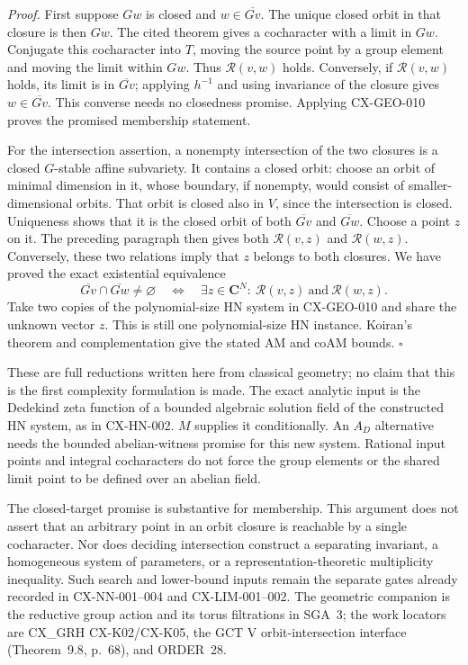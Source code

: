 \emph{Proof.} First suppose $Gw$ is closed and
$w\in\overline{Gv}$. The unique closed orbit in that closure is then
$Gw$. The cited theorem gives a cocharacter with a limit in $Gw$.
Conjugate this cocharacter into $T$, moving the source point by a group
element and moving the limit within $Gw$. Thus $\mathcal R(v,w)$
holds. Conversely, if $\mathcal R(v,w)$ holds, its limit is in
$\overline{Gv}$; applying $h^{-1}$ and using invariance of the closure
gives $w\in\overline{Gv}$. This converse needs no closedness promise.
Applying CX-GEO-010 proves the promised membership statement.

For the intersection assertion, a nonempty intersection of the two
closures is a closed $G$-stable affine subvariety. It contains a closed
orbit: choose an orbit of minimal dimension in it, whose boundary, if
nonempty, would consist of smaller-dimensional orbits. That orbit is
closed also in $V$, since the intersection is closed. Uniqueness shows
that it is the closed orbit of both $\overline{Gv}$ and
$\overline{Gw}$. Choose a point $z$ on it. The preceding paragraph
then gives both $\mathcal R(v,z)$ and $\mathcal R(w,z)$.
Conversely, these two relations imply that $z$ belongs to both closures.
We have proved the exact existential equivalence
\[
 \overline{Gv}\cap\overline{Gw}\ne\varnothing
       \quad\Longleftrightarrow\quad
       \exists z\in\mathbf C^N:\
                  \mathcal R(v,z)\ \text{and}\ \mathcal R(w,z).
\]
Take two copies of the polynomial-size HN system in CX-GEO-010 and share
the unknown vector $z$. This is still one polynomial-size HN instance.
Koiran's theorem and complementation give the stated AM and coAM bounds.
\hfill$\square$

These are full reductions written here from classical geometry; no claim
that this is the first complexity formulation is made. The exact analytic
input is the Dedekind zeta function of a bounded algebraic solution field
of the constructed HN system, as in CX-HN-002. $M$ supplies it
conditionally. An $A_D$ alternative needs the bounded abelian-witness
promise for this new system. Rational input points and integral
cocharacters do not force the group elements or the shared limit point
to be defined over an abelian field.

The closed-target promise is substantive for membership. This argument
does not assert that an arbitrary point in an orbit closure is reachable
by a single cocharacter. Nor does deciding intersection construct a
separating invariant, a homogeneous system of parameters, or a
representation-theoretic multiplicity inequality. Such search and
lower-bound inputs remain the separate gates already recorded in
CX-NN-001--004 and CX-LIM-001--002. The geometric companion is the
reductive group action and its torus filtrations in SGA~3; the work
locators are CX\_GRH CX-K02/CX-K05, the GCT V orbit-intersection
interface (Theorem~9.8, p.~68), and ORDER~28.
